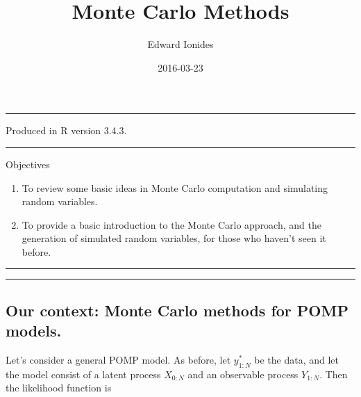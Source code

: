 \documentclass[]{article}
\title{Monte Carlo Methods}
\author{Edward Ionides}
\date{2016-03-23}
\begin{document}
\maketitle

{
\setcounter{tocdepth}{2}
\tableofcontents
}
\newcommand\prob{\mathbb{P}}
\newcommand\E{\mathbb{E}}
\newcommand\var{\mathrm{Var}}
\newcommand\cov{\mathrm{Cov}}
\newcommand\loglik{\ell}
\newcommand\R{\mathbb{R}}
\newcommand\data[1]{#1^*}
\newcommand\params{\, ; \,}
\newcommand\transpose{\scriptsize{T}}
\newcommand\eqspace{\quad\quad}
\newcommand\myeq[1]{\eqspace \displaystyle #1}
\newcommand\lik{\mathcal{L}}
\newcommand\profileloglik[1]{\ell^\mathrm{profile}_#1}
\newcommand\given{{\, | \,}}
\newcommand\equals{{=\,}}
\newcommand\nmc{j}
\newcommand\Nmc{J}
\newcommand\dimX{\mathrm{dim}(X)}
\newcommand\dimY{\mathrm{dim}(Y)}

\begin{center}\rule{0.5\linewidth}{\linethickness}\end{center}

Produced in R version 3.4.3.

\begin{center}\rule{0.5\linewidth}{\linethickness}\end{center}

Objectives

\begin{enumerate}
\def\labelenumi{\arabic{enumi}.}
\item
  To review some basic ideas in Monte Carlo computation and simulating
  random variables.
\item
  To provide a basic introduction to the Monte Carlo approach, and the
  generation of simulated random variables, for those who haven't seen
  it before.
\end{enumerate}

\begin{center}\rule{0.5\linewidth}{\linethickness}\end{center}

\begin{center}\rule{0.5\linewidth}{\linethickness}\end{center}

\subsection{Our context: Monte Carlo methods for POMP
models.}\label{our-context-monte-carlo-methods-for-pomp-models.}

Let's consider a general POMP model. As before, let \(\data{y_{1:N}}\)
be the data, and let the model consist of a latent process \(X_{0:N}\)
and an observable process \(Y_{1:N}\). Then the likelihood function is
\end{document}
